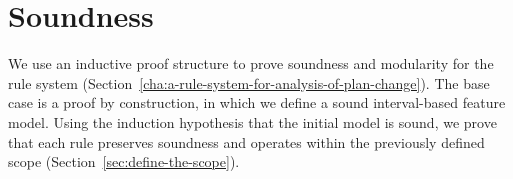 \chapter{Soundness}
\label{cha:soundness}



We use an inductive proof structure to prove soundness and modularity for the rule system (Section~\vref{cha:a-rule-system-for-analysis-of-plan-change}). The base case is a proof by construction, in which we define a sound interval-based feature model. Using the induction hypothesis that the initial model is sound, we prove that each rule preserves soundness and operates within the previously defined scope (Section~\vref{sec:define-the-scope}).






















